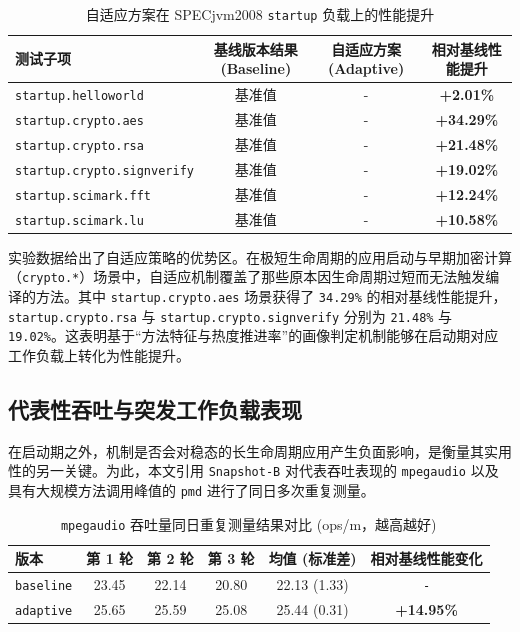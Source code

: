 \begin{table}[htbp]
    \centering
    \small
    \caption{自适应方案在 SPECjvm2008 \texttt{startup} 负载上的性能提升}
    \label{tab:startup-screening}
    \begin{tabular}{lccc}
        \hline
        \textbf{测试子项} & \textbf{基线版本结果 (Baseline)} & \textbf{自适应方案 (Adaptive)} & \textbf{相对基线性能提升} \\
        \hline
        \texttt{startup.helloworld} & 基准值 & - & \textbf{+2.01\%} \\
        \texttt{startup.crypto.aes} & 基准值 & - & \textbf{+34.29\%} \\
        \texttt{startup.crypto.rsa} & 基准值 & - & \textbf{+21.48\%} \\
        \texttt{startup.crypto.signverify} & 基准值 & - & \textbf{+19.02\%} \\
        \texttt{startup.scimark.fft} & 基准值 & - & \textbf{+12.24\%} \\
        \texttt{startup.scimark.lu} & 基准值 & - & \textbf{+10.58\%} \\
        \hline
    \end{tabular}
\end{table}

实验数据给出了自适应策略的优势区。在极短生命周期的应用启动与早期加密计算（\texttt{crypto.*}）场景中，自适应机制覆盖了那些原本因生命周期过短而无法触发编译的方法。其中 \texttt{startup.crypto.aes} 场景获得了 \texttt{34.29\%} 的相对基线性能提升，\texttt{startup.crypto.rsa} 与 \texttt{startup.crypto.signverify} 分别为 \texttt{21.48\%} 与 \texttt{19.02\%}。这表明基于“方法特征与热度推进率”的画像判定机制能够在启动期对应工作负载上转化为性能提升。

\subsection{代表性吞吐与突发工作负载表现}

在启动期之外，机制是否会对稳态的长生命周期应用产生负面影响，是衡量其实用性的另一关键。为此，本文引用 \texttt{Snapshot-B} 对代表吞吐表现的 \texttt{mpegaudio} 以及具有大规模方法调用峰值的 \texttt{pmd} 进行了同日多次重复测量。

\begin{table}[htbp]
    \centering
    \small
    \caption{\texttt{mpegaudio} 吞吐量同日重复测量结果对比 (ops/m，越高越好)}
    \label{tab:mpegaudio-result}
    \begin{tabular}{lccccc}
        \hline
        \textbf{版本} & \textbf{第 1 轮} & \textbf{第 2 轮} & \textbf{第 3 轮} & \textbf{均值 (标准差)} & \textbf{相对基线性能变化} \\
        \hline
        \texttt{baseline} & 23.45 & 22.14 & 20.80 & 22.13 (1.33) & \texttt{-} \\
        \texttt{adaptive} & 25.65 & 25.59 & 25.08 & 25.44 (0.31) & \textbf{+14.95\%} \\
        \hline
    \end{tabular}
\end{table}

